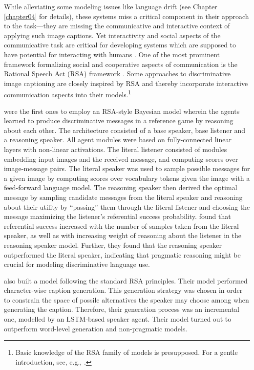 While alleviating some modeling issues like language drift (see Chapter \ref{chapter04} for details), these systems miss a critical component in their approach to the task---they are missing the communicative and interactive context of applying such image captions. Yet interactivity and social aspects of the communicative task are critical for developing systems which are supposed to have potential for interacting with humans \parencite{lazaridou2020emergent}. One of the most prominent framework formalizing social and cooperative aspects of communication is the Rational Speech Act (RSA) framework \parencite{goodman2016pragmatic}. Some approaches to discriminative image captioning are closely inspired by RSA and thereby incorporate interactive communication aspects into their models.\footnote{Basic knowledge of the RSA family of models is presupposed. For a gentle introduction, see, e.g., \cite{goodman2016pragmatic, problang}.}

\cite{andreas2016reasoning} were the first ones to employ an RSA-style Bayesian model wherein the agents learned to produce discriminative messages in a reference game by reasoning about each other. The architecture consisted of a base speaker, base listener and a reasoning speaker. All agent modules were based on fully-connected linear layers with non-linear activations. The literal listener consisted of modules embedding input images and the received message, and computing scores over image-message pairs. The literal speaker was used to sample possible messages for a given image by computing scores over vocabulary tokens given the image with a feed-forward language model. The reasoning speaker then derived the optimal message by sampling candidate messages from the literal speaker and reasoning about their utility by ``passing'' them through the literal listener and choosing the message maximizing the listener's referential success probability. 
\cite{andreas2016reasoning} found that referential success increased with the number of samples taken from the literal speaker, as well as with increasing weight of reasoning about the listener in the reasoning speaker model. Further, they found that the reasoning speaker outperformed the literal speaker, indicating that pragmatic reasoning might be crucial for modeling discriminative language use. 

\cite{cohn2018pragmatically} also built a model following the standard RSA principles. Their model performed character-wise caption generation. This generation strategy was chosen in order to constrain the space of possile alternatives the speaker may choose among when generating the caption. Therefore, their generation process was an incremental one, modelled by an LSTM-based speaker agent. Their model  turned out to outperform word-level generation and non-pragmatic models.

